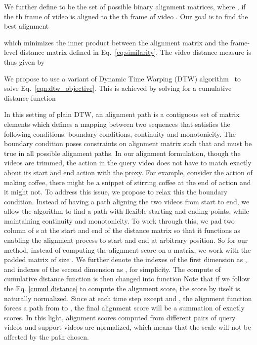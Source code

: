 \documentclass[10pt,twocolumn,letterpaper]{article}
\begin{document}
We further define  to be the set of possible binary alignment matrices, where ,  if the th frame of video  is aligned to the th frame of video . Our goal is to find the best alignment 

which minimizes the inner product between the alignment matrix  and the frame-level distance matrix  defined in Eq.~\eqref{eq:similarity}. The video distance measure is thus given by 

We propose to use a variant of Dynamic Time Warping (DTW) algorithm~\cite{muller2007dynamic} to solve Eq.~\eqref{eqn:dtw_objective}. This is achieved by solving for a cumulative distance function
{\small }

In this setting of plain DTW, an alignment path is a contiguous set of matrix elements which defines a mapping between two sequences that satisfies the following conditions: boundary conditions, continuity and monotonicity. The boundary condition poses constraints on alignment matrix  such that  and  must be true in all possible alignment paths. 
In our alignment formulation, though the videos are trimmed, the action in the query video does not have to match exactly about its start and end action with the proxy. For example, consider the action of making coffee, there might be a snippet of stirring coffee at the end of action and it might not. To address this issue, we propose to relax this the boundary condition. Instead of having a path aligning the two videos from start to end, we allow the algorithm to find a path with flexible starting and ending points, while maintaining continuity and monotonicity. To work through this, we pad two column of s at the start and end of the distance matrix so that it functions as enabling the alignment process to start and end at arbitrary position. So for our method, instead of computing the alignment score on a  matrix, we work with the padded matrix of size . We further denote the indexes of the first dimension as , and indexes of the second dimension as , for simplicity. The compute of cumulative distance function is then changed into function
{\small }
Note that if we follow the Eq. \ref{cumul distance} to compute the alignment score, the score by itself is naturally normalized. Since at each time step except  and , the alignment function forces a path from  to , the final alignment score will be a summation of exactly  scores. In this light, alignment scores computed from different pairs of query videos and support videos are normalized, which means that the scale will not be affected by the path chosen. 
\end{document}
